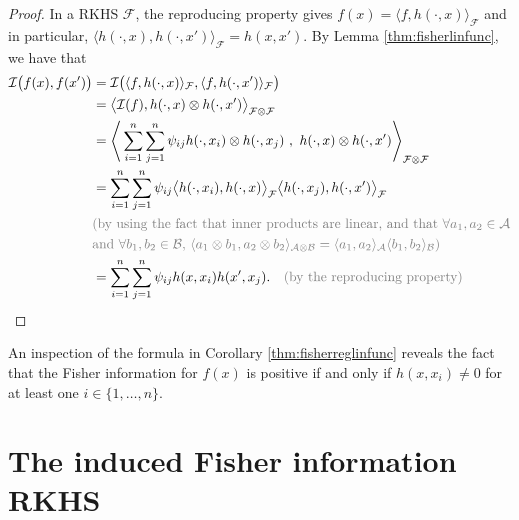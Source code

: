 \documentclass[a4paper,showframe,11pt,draft]{report}
\begin{document}
\begin{proof}
	In a RKHS $\mathcal F$, the reproducing property gives $f(x) = \langle f, h(\cdot, x) \rangle_{\mathcal F}$ and in particular, $\langle h(\cdot,x), h(\cdot, x') \rangle_{\mathcal F} = h(x,x')$. 
	By Lemma \ref{thm:fisherlinfunc}, we have that
	\begin{align*}
		\cI\big(f(x),f(x')\big) 
		&= \cI\big(\langle f, h(\cdot, x) \rangle_{\cF},\langle f, h(\cdot, x') \rangle_{\cF} \big) \\
		&= \big\langle \cI(f), h(\cdot, x) \otimes h(\cdot, x') \big\rangle_{\mathcal F \otimes \mathcal F} \\
		&= \Bigg\langle \sum_{i=1}^n\sum_{j=1}^n \psi_{ij} h(\cdot,x_i) \otimes h(\cdot,x_j) \ , \ h(\cdot, x) \otimes h(\cdot, x') \Bigg\rangle_{\mathcal F \otimes \mathcal F} \\
		&= \sum_{i=1}^n\sum_{j=1}^n \psi_{ij} \big\langle h(\cdot,x_i), h(\cdot, x) \big\rangle_{\mathcal F} \big\langle h(\cdot,x_j), h(\cdot, x') \big\rangle_{\mathcal F } \\
		&{\color{gray}\text{(by using the fact that inner products are linear, and that $\forall a_1, a_2 \in \mathcal A$}} \\
		&{\color{gray}\text{and $\forall b_1, b_2 \in \mathcal B$, $\langle a_1 \otimes b_1, a_2 \otimes b_2 \rangle_{\mathcal A \otimes \mathcal B} = \langle a_1, a_2 \rangle_{\mathcal A}\langle b_1, b_2 \rangle_{\mathcal B}$)}} \\
		&= \sum_{i=1}^n\sum_{j=1}^n \psi_{ij} h(x,x_i) h(x', x_j).
		\ \ \ \rlap {\color{gray}\text{(by the reproducing property)}} 
	\end{align*}
\end{proof}

An inspection of the formula in Corollary \eqref{thm:fisherreglinfunc} reveals the fact that the Fisher information for $f(x)$ is positive if and only if $h(x,x_i)\neq 0$ for at least one $i \in \{1,\dots,n \}$.

\section{The induced Fisher information RKHS}
\end{document}
